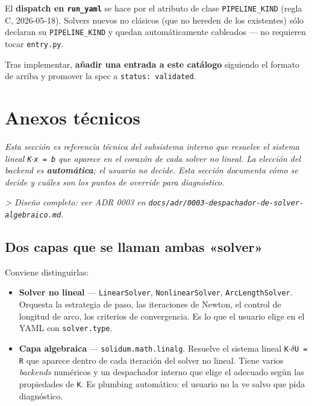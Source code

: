 \documentclass[11pt,letterpaper,oneside]{report}
\begin{document}
El \textbf{dispatch en \texttt{run\_yaml}} se hace por el atributo de clase \texttt{PIPELINE\_KIND} (regla C, 2026-05-18). Solvers nuevos no clásicos (que no hereden de los existentes) sólo declaran su \texttt{PIPELINE\_KIND} y quedan automáticamente cableados --- no requieren tocar \texttt{entry.py}.

Tras implementar, \textbf{añadir una entrada a este catálogo} siguiendo el formato de arriba y promover la spec a \texttt{status: validated}.


\newpage

\chapter{Anexos técnicos}



\textit{Esta sección es referencia técnica del subsistema interno que resuelve el sistema lineal \texttt{K\ensuremath{\cdot}x = b} que aparece en el corazón de cada solver no lineal. La elección del backend es \textbf{automática}; el usuario no decide. Esta sección documenta cómo se decide y cuáles son los puntos de override para diagnóstico.}

\textit{> Diseño completo: ver ADR 0003 en \texttt{docs/adr/0003-despachador-de-solver-algebraico.md}.}


\section{Dos capas que se llaman ambas «solver»}

Conviene distinguirlas:

\begin{itemize}
  \item \textbf{Solver no lineal} --- \texttt{LinearSolver}, \texttt{NonlinearSolver}, \texttt{ArcLengthSolver}. Orquesta la estrategia de paso, las iteraciones de Newton, el control de longitud de arco, los criterios de convergencia. Es lo que el usuario elige en el YAML con \texttt{solver.type}.
  \item \textbf{Capa algebraica} --- \texttt{solidum.math.linalg}. Resuelve el sistema lineal \texttt{K\ensuremath{\cdot}\ensuremath{\delta}U = R} que aparece dentro de cada iteración del solver no lineal. Tiene varios \textit{backends} numéricos y un despachador interno que elige el adecuado según las propiedades de \texttt{K}. Es plumbing automático: el usuario no la ve salvo que pida diagnóstico.
\end{itemize}
\end{document}

